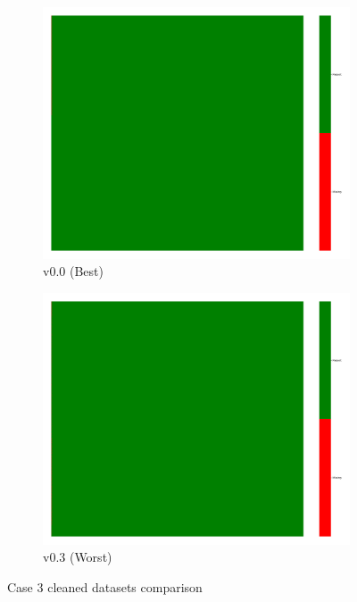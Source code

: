 \documentclass[a4paper,12pt]{article}
\begin{document}
\begin{figure}[H]
    \centering
    \begin{subfigure}{0.45\textwidth}
        \includegraphics[width=\linewidth]{case3_v0.0_heatmap_cleaned.png}
        \caption{v0.0 (Best)}
    \end{subfigure}
    \hfill
    \begin{subfigure}{0.45\textwidth}
        \includegraphics[width=\linewidth]{case3_v0.3_heatmap_cleaned.png}
        \caption{v0.3 (Worst)}
    \end{subfigure}
    \caption{Case 3 cleaned datasets comparison}
\end{figure}
\end{document}
